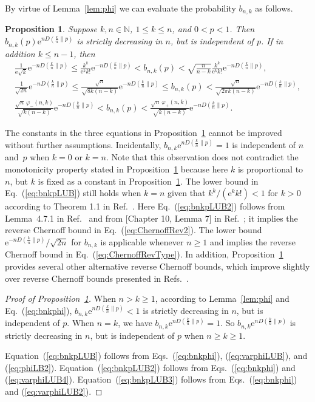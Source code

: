 \documentclass[aop]{imsart}
\theoremstyle{plain}
\newtheorem{proposition}[theorem]{Proposition}
\theoremstyle{remark}
\newcommand{\rme}{\mathrm{e}}
\newcommand{\bbN}{\mathbb{N}}
\newcommand{\1}{\operatorname{\uppercase\expandafter{\romannumeral1}}}
\newcommand{\2}{\operatorname{\uppercase\expandafter{\romannumeral2}}}
\newcommand{\3}{\operatorname{\uppercase\expandafter{\romannumeral3}}}
\newcommand{\4}{\operatorname{\uppercase\expandafter{\romannumeral4}}}
\newcommand{\5}{\operatorname{\uppercase\expandafter{\romannumeral5}}}
\newcommand{\6}{\operatorname{\uppercase\expandafter{\romannumeral6}}}
\newcommand{\7}{\operatorname{\uppercase\expandafter{\romannumeral7}}}
\newcommand{\8}{\operatorname{\uppercase\expandafter{\romannumeral8}}}
\newcommand{\9}{\operatorname{\uppercase\expandafter{\romannumeral9}}}
\newcommand{\eref}[1]{Eq.~\textup{(\ref{#1})}}
\newcommand{\Eref}[1]{Equation~\textup{(\ref{#1})}}
\newcommand{\eqsref}[2]{Eqs.~(\ref{#1}) and (\ref{#2})}
\newcommand{\eqssref}[3]{Eqs.~(\ref{#1}), (\ref{#2}), and (\ref{#3})}
\newcommand{\lref}[1]{Lemma~\ref{#1}}
\newcommand{\pref}[1]{Proposition~\ref{#1}}
\newcommand{\rcite}[1]{Ref.~\cite{#1}}
\newcommand{\rscite}[1]{Refs.~\cite{#1}}
\begin{document}
By virtue of \lref{lem:phi} we can evaluate the probability
$b_{n,k}$ as follows.
\begin{proposition}\label{pro:bnkpLUB}
	Suppose  $k,n\in \bbN$, $1\leq k\leq n$, and $0<p<1$. Then  $b_{n,k}(p)\rme^{nD(\frac{k}{n}\| p)}$ is strictly decreasing in $n$,  but is independent of $p$. 	If in addition $k\leq n-1$, then
	\begin{gather}	
\frac{1}{\rme \sqrt{k}} \rme^{-nD(\frac{k}{n}\| p)}\leq \frac{k^k}{\rme^k k!}\rme^{-nD(\frac{k}{n}\| p)}<    b_{n,k}(p)< \sqrt{\frac{n}{n-k}}\frac{k^k}{\rme^k k!}\rme^{-nD(\frac{k}{n}\| p)},
\label{eq:bnkpLUB}\\
\frac{1}{\sqrt{2n}} \rme^{-nD(\frac{k}{n}\| p)}\leq \frac{\sqrt{n}}{ \sqrt{8k(n-k)}} \rme^{-nD(\frac{k}{n}\| p)}\leq 	b_{n,k}(p)< \frac{\sqrt{n}}{\sqrt{2\pi k(n-k)}} \rme^{-nD(\frac{k}{n}\| p)},
\label{eq:bnkpLUB2}\\
\frac{\sqrt{n}\,\varphi_-(n,k)}{ \sqrt{k(n-k)}} \rme^{-nD(\frac{k}{n}\| p)}
< b_{n,k}(p) < \frac{\sqrt{n}\,\varphi_+(n,k)}{\sqrt{k(n-k)}} \rme^{-nD(\frac{k}{n}\| p)}. \label{eq:bnkpLUB3}
	\end{gather}	
\end{proposition}
The constants in the three equations in \pref{pro:bnkpLUB} cannot be improved without further assumptions. Incidentally,   $b_{n,k}\rme^{nD(\frac{k}{n}\| p)}=1$ 
is independent of $n$ and~$p$ when $k=0$ or $k=n$. Note that this observation does not contradict the monotonicity property stated in \pref{pro:bnkpLUB} because here $k$ is proportional to $n$, but $k$ is fixed as a constant in \pref{pro:bnkpLUB}.
The lower bound in \eref{eq:bnkpLUB} still holds when $k=n$ given that $k^k/(\rme^k k!)<1$ for $k>0$ according to Theorem 1.1 in \rcite{Guo06}. 
Here
\eref{eq:bnkpLUB2}  follows from Lemma~4.7.1  in Ref.~\cite{Ash92book} and from [Chapter 10, Lemma 7] in Ref.~\cite{MacWS77book}; it implies the reverse Chernoff bound in \eref{eq:ChernoffRev2}.  The lower bound $\rme^{-nD(\frac{k}{n}\| p)}/\sqrt{2n}$ for $b_{n,k}$ is applicable whenever $n\geq1$ and implies the reverse Chernoff bound   in \eref{eq:ChernoffRevType}. In addition, \pref{pro:bnkpLUB}  provides several other alternative reverse Chernoff bounds, which improve slightly over
reverse Chernoff bounds presented in 
\rscite{CsisK11,Csis98,Haya17book,WataH17}.


\begin{proof}[Proof of \pref{pro:bnkpLUB}]
When $n>k\geq 1$,	according to \lref{lem:phi} and \eref{eq:bnkphi},  $b_{n,k}\rme^{nD(\frac{k}{n}\| p)}<1$	is strictly decreasing in $n$, but is independent of $p$. When $n=k$, we have $b_{n,k}\rme^{nD(\frac{k}{n}\| p)}=1$. So  $b_{n,k}\rme^{nD(\frac{k}{n}\| p)}$ is strictly decreasing in $n$,  but is independent of $p$ when $n\geq k\geq 1$.
	
 \Eref{eq:bnkpLUB} follows from \eqssref{eq:bnkphi}{eq:varphiLUB}{eq:phiLB2}.
\Eref{eq:bnkpLUB2}  follows from \eqsref{eq:bnkphi}{eq:varphiLUB4}. 
 	\Eref{eq:bnkpLUB3} follows from \eqsref{eq:bnkphi}{eq:varphiLUB2}. 
\end{proof}
\end{document}
